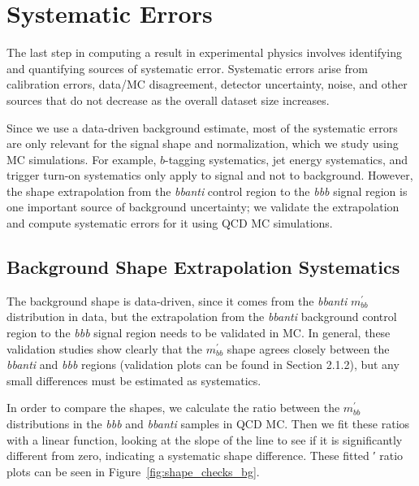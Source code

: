  

\chapter[Systematic Errors]{Systematic Errors}

The last step in computing a result in experimental physics involves identifying
and quantifying sources of systematic error.  Systematic errors arise from calibration
errors, data/MC disagreement, detector uncertainty, noise, and other sources
that do not decrease as the overall dataset size increases.  

Since we use a data-driven background estimate, most of the systematic errors
are only relevant for the signal shape and normalization, which we study using 
MC simulations.  For example, $b$-tagging systematics, jet energy systematics, 
and trigger turn-on systematics only apply to signal and not to background.  
However, the shape extrapolation from the \textit{bbanti} control region to the
\textit{bbb} signal region is one important source of background uncertainty;
we validate the extrapolation and compute systematic errors for it using QCD MC simulations.

\section{Background Shape Extrapolation Systematics}
The background shape is data-driven, since it comes from the \textit{bbanti} $m^{'}_{bb}$ distribution in data, but the
extrapolation from the \textit{bbanti} background control region to the \textit{bbb} signal region needs to be validated
in MC. In general, these validation studies show clearly that the $m^{'}_{bb}$ shape agrees closely between the
\textit{bbanti} and \textit{bbb} regions (validation plots can be found in Section 2.1.2), but any small differences must
be estimated as systematics.

In order to compare the shapes, we calculate the ratio between the $m^{'}_{bb}$ distributions in the \textit{bbb} and
\textit{bbanti} samples in QCD MC. Then we fit these ratios with a linear function, looking at the slope of the
line to see if it is significantly different from zero, indicating a systematic shape difference. These fitted ′
ratio plots can be seen in Figure~\ref{fig:shape_checks_bg}.


